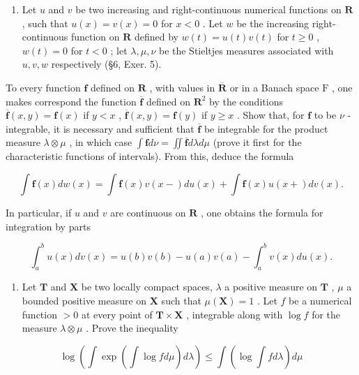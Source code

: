 \begin{enumerate}
\def\labelenumi{\arabic{enumi})}
\setcounter{enumi}{8}
\tightlist
\item
  Let \(u\) and \(v\) be two increasing and right-continuous numerical functions on \(\mathbf{R}\) , such that \(u(x) = v(x) = 0\) for \(x < 0\) . Let \(w\) be the increasing right-continuous function on \(\mathbf{R}\) defined by \(w(t) = u(t)v(t)\) for \(t \geqslant 0\) , \(w(t) = 0\) for \(t < 0\) ; let \(\lambda, \mu, \nu\) be the Stieltjes measures associated with \(u, v, w\) respectively (§6, Exer. 5).
\end{enumerate}

To every function \(\mathbf{f}\) defined on \(\mathbf{R}\) , with values in \(\overline{\mathbf{R}}\) or in a Banach space \(\mathrm{F}\) , one makes correspond the function \(\overline{\mathbf{f}}\) defined on \(\mathbf{R}^2\) by the conditions \(\overline{\mathbf{f}}(x,y) = \mathbf{f}(x)\) if \(y < x\) , \(\overline{\mathbf{f}}(x,y) = \mathbf{f}(y)\) if \(y \geqslant x\) . Show that, for \(\mathbf{f}\) to be \(\nu\) -integrable, it is necessary and sufficient that \(\overline{\mathbf{f}}\) be integrable for the product measure \(\lambda \otimes \mu\) , in which case \(\int \mathbf{f} d\nu = \iint \overline{\mathbf{f}} d\lambda d\mu\) (prove it first for the characteristic functions of intervals). From this, deduce the formula

\[
\int \mathbf {f} (x) d w (x) = \int \mathbf {f} (x) v (x -) d u (x) + \int \mathbf {f} (x) u (x +) d v (x).
\]

In particular, if \(u\) and \(v\) are continuous on \(\mathbf{R}\) , one obtains the formula for integration by parts

\[
\int_ {a} ^ {b} u (x) d v (x) = u (b) v (b) - u (a) v (a) - \int_ {a} ^ {b} v (x) d u (x).
\]

\begin{enumerate}
\def\labelenumi{\arabic{enumi})}
\setcounter{enumi}{9}
\tightlist
\item
  Let \(\mathbf{T}\) and \(\mathbf{X}\) be two locally compact spaces, \(\lambda\) a positive measure on \(\mathbf{T}\) , \(\mu\) a bounded positive measure on \(\mathbf{X}\) such that \(\mu(\mathbf{X}) = 1\) . Let \(f\) be a numerical function \(> 0\) at every point of \(\mathbf{T} \times \mathbf{X}\) , integrable along with \(\log f\) for the measure \(\lambda \otimes \mu\) . Prove the inequality
\end{enumerate}

\[
\log \left(\int \exp (\int \log f d \mu) d \lambda\right) \leqslant \int (\log \int f d \lambda) d \mu
\]


